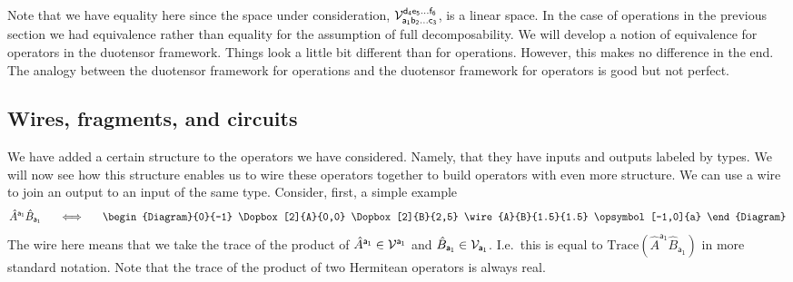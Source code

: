 \documentclass[10pt]{article}
\begin{document}
Note that we have equality here since the space under consideration, ${\cal V}_\mathsf{a_1b_2\dots c_3}^\mathsf{d_4e_5\dots f_6}$, is a linear space.  In the case of operations in the previous section we had equivalence rather than equality for the assumption of full decomposability.  We will develop a notion of equivalence for operators in the duotensor framework.  Things look a little bit different than for operations.  However, this makes no difference in the end. The analogy between the duotensor framework for operations and the duotensor framework for operators is good but not perfect.


\subsection{Wires, fragments, and circuits}\label{operatorwiresfragscircuits}

We have added a certain structure to the operators we have considered. Namely, that they have inputs and outputs labeled by types.  We will now see how this structure enables us to wire these operators together to build operators with even more structure.  We can use a wire to join an output to an input of the same type. Consider, first, a simple example
\begin{equation}
\hat A^\mathsf{a_1} \hat B_\mathsf{a_1}~~~~~ \Longleftrightarrow ~~~~~
\begin{Diagram}{0}{-1}
\Dopbox[2]{A}{0,0} \Dopbox[2]{B}{2,5} \wire{A}{B}{1.5}{1.5} \opsymbol[-1,0]{a}
\end{Diagram}
\end{equation}
The wire here means that we take the trace of the product of $\hat A^\mathsf{a_1}\in {\cal V}^\mathsf{a_1}$ and $\hat B_\mathsf{a_1}\in{\cal V}_\mathsf{a_1}$.  I.e.\ this is equal to $\text{Trace}(\hat A^\mathsf{a_1} \hat B_\mathsf{a_1})$ in more standard notation.  Note that the trace of the product of two Hermitean operators is always real.
\end{document}
